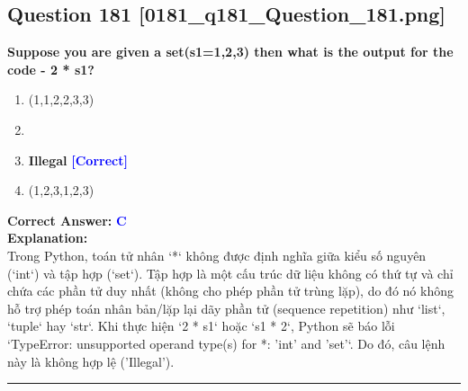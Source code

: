 \documentclass[11pt,a4paper]{article}
\begin{document}
\begin{minipage}{\textwidth}
\subsection*{Question 181 \quad \footnotesize{[0181_q181_Question_181.png]}}
\noindent \textbf{Suppose you are given a set(s1=1,2,3) then what is the output for the code - 2 * s1?}

\begin{enumerate}[label=\Alph*.]
    \item (1,1,2,2,3,3)
    \item [1,1,2,2,3,3]
    \item \textbf{Illegal} \hfill \textcolor{blue}{\textbf{[Correct]}}
    \item (1,2,3,1,2,3)
\end{enumerate}

\noindent \textbf{Correct Answer:} \textcolor{blue}{\textbf{C}} \\[4pt]
\noindent \textbf{Explanation:}\\
Trong Python, toán tử nhân `*` không được định nghĩa giữa kiểu số nguyên (`int`) và tập hợp (`set`). Tập hợp là một cấu trúc dữ liệu không có thứ tự và chỉ chứa các phần tử duy nhất (không cho phép phần tử trùng lặp), do đó nó không hỗ trợ phép toán nhân bản/lặp lại dãy phần tử (sequence repetition) như `list`, `tuple` hay `str`. Khi thực hiện `2 * s1` hoặc `s1 * 2`, Python sẽ báo lỗi `TypeError: unsupported operand type(s) for *: 'int' and 'set'`. Do đó, câu lệnh này là không hợp lệ ('Illegal').
\end{minipage}
\vspace{0.8cm}
\hrule
\vspace{0.5cm}
\end{document}
